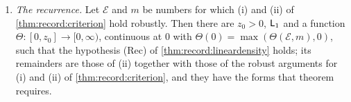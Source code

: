 \begin{lemma}
\begin{enumerate}[label=(\roman*)]
\begin{enumerate}[label=(\alph*)]
 \item the terms of the selections whose union $E$ of atoms has $q_E>N^\tau$,
  in finitely many sums of the form bounded in \cref{lem:record:density-lp}
  whose coefficients $\eta_{\Blk}$ are the prices of the selected laws after the operator-to-energy reduction of \cref{lem:record:rec}(ii) (the \emph{post-reduction prices}); together they have the bound of one such sum, with $c$ the sum of their constants, and with $\Pi_{\rm H}=\prod_\Blk(1+\eta_\Blk q_\Blk^{1/4})$ as in \cref{lem:record:density-lp}; neither $c$ nor $\Pi_{\rm H}$ depends on $\Lsc$ or $A$.
 \end{enumerate}
\item\emph{The recurrence.} Let $\mathcal E$ and $m$ be numbers for which (i)
 and (ii) of \cref{thm:record:criterion} hold robustly. Then there are
 $z_0>0$, $\mathsf L_1$ and a function $\Theta\colon[0,z_0]\to[0,\infty)$,
 continuous at $0$ with $\Theta(0)=\max(\Theta(\mathcal E,m),0)$, such that
 the hypothesis (Rec) of \cref{thm:record:lineardensity} holds; its
 remainders are those of (ii) together with those of the robust arguments
 for (i) and (ii) of \cref{thm:record:criterion}, and they have the forms
 that theorem requires.
\end{enumerate}
\end{lemma}

